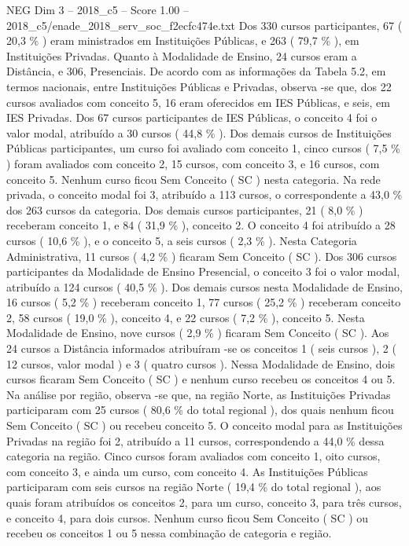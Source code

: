 \begin{textsample}{NEG Dim 3 – 2018\_c5 – Score 1.00 – 2018\_c5/enade\_2018\_serv\_soc\_f2ecfc474e.txt}
Dos 330 cursos participantes, 67 ( 20,3 \% ) eram ministrados em Instituições Públicas, e 263 ( 79,7 \% ), em Instituições Privadas.
Quanto à Modalidade de Ensino, 24 cursos eram a Distância, e 306, Presenciais.
De acordo com as informações da Tabela 5.2, em termos nacionais, entre Instituições Públicas e Privadas, observa -se que, dos 22 cursos avaliados com conceito 5, 16 eram oferecidos em IES Públicas, e seis, em IES Privadas.
Dos 67 cursos participantes de IES Públicas, o conceito 4 foi o valor modal, atribuído a 30 cursos ( 44,8 \% ).
Dos demais cursos de Instituições Públicas participantes, um curso foi avaliado com conceito 1, cinco cursos ( 7,5 \% ) foram avaliados com conceito 2, 15 cursos, com conceito 3, e 16 cursos, com conceito 5.
Nenhum curso ficou Sem Conceito ( SC ) nesta categoria.
Na rede privada, o conceito modal foi 3, atribuído a 113 cursos, o correspondente a 43,0 \% dos 263 cursos da categoria.
Dos demais cursos participantes, 21 ( 8,0 \% ) receberam conceito 1, e 84 ( 31,9 \% ), conceito 2.
O conceito 4 foi atribuído a 28 cursos ( 10,6 \% ), e o conceito 5, a seis cursos ( 2,3 \% ).
Nesta Categoria Administrativa, 11 cursos ( 4,2 \% ) ficaram Sem Conceito ( SC ).
Dos 306 cursos participantes da Modalidade de Ensino Presencial, o conceito 3 foi o valor modal, atribuído a 124 cursos ( 40,5 \% ).
Dos demais cursos nesta Modalidade de Ensino, 16 cursos ( 5,2 \% ) receberam conceito 1, 77 cursos ( 25,2 \% ) receberam conceito 2, 58 cursos ( 19,0 \% ), conceito 4, e 22 cursos ( 7,2 \% ), conceito 5.
Nesta Modalidade de Ensino, nove cursos ( 2,9 \% ) ficaram Sem Conceito ( SC ).
Aos 24 cursos a Distância informados atribuíram -se os conceitos 1 ( seis cursos ), 2 ( 12 cursos, valor modal ) e 3 ( quatro cursos ).
Nessa Modalidade de Ensino, dois cursos ficaram Sem Conceito ( SC ) e nenhum curso recebeu os conceitos 4 ou 5.
Na análise por região, observa -se que, na região Norte, as Instituições Privadas participaram com 25 cursos ( 80,6 \% do total regional ), dos quais nenhum ficou Sem Conceito ( SC ) ou recebeu conceito 5.
O conceito modal para as Instituições Privadas na região foi 2, atribuído a 11 cursos, correspondendo a 44,0 \% dessa categoria na região.
Cinco cursos foram avaliados com conceito 1, oito cursos, com conceito 3, e ainda um curso, com conceito 4.
As Instituições Públicas participaram com seis cursos na região Norte ( 19,4 \% do total regional ), aos quais foram atribuídos os conceitos 2, para um curso, conceito 3, para três cursos, e conceito 4, para dois cursos.
Nenhum curso ficou Sem Conceito ( SC ) ou recebeu os conceitos 1 ou 5 nessa combinação de categoria e região.

\end{textsample}
